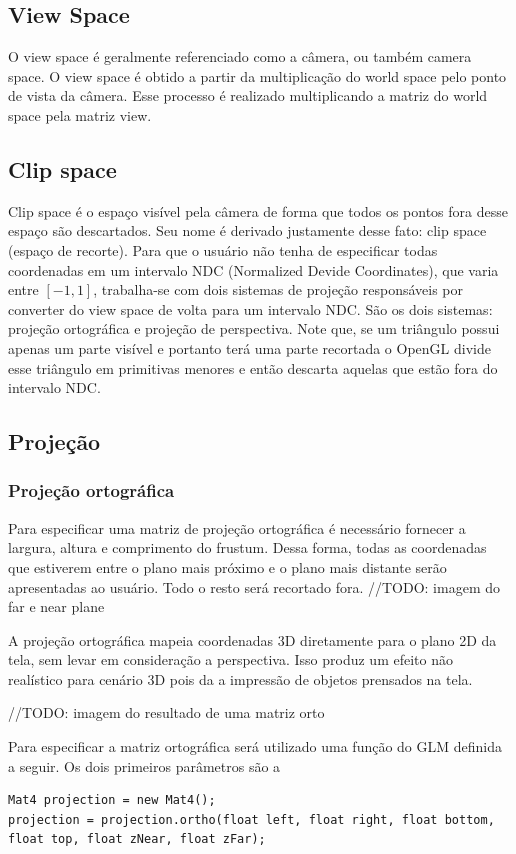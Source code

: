 \documentclass[12pt, 
openright, 
oneside, 
a4paper,    
brazil]{facom-ufu-abntex2}
\begin{document}
\subsection{View Space}
O view space é geralmente referenciado como a câmera, ou também camera space. O view space é obtido a partir da multiplicação do world space pelo ponto de vista da câmera. Esse processo é realizado multiplicando a matriz do world space pela matriz view.

\subsection{Clip space}
Clip space é o espaço visível pela câmera de forma que todos os pontos fora desse espaço são descartados. Seu nome é derivado justamente desse fato: clip space (espaço de recorte). Para que o usuário não tenha de especificar todas coordenadas em um intervalo NDC (Normalized Devide Coordinates), que varia entre $[-1,1]$, trabalha-se com dois sistemas de projeção responsáveis por converter do view space de volta para um intervalo NDC. São os dois sistemas: projeção ortográfica e projeção de perspectiva.
Note que, se um triângulo possui apenas um parte visível e portanto terá uma parte recortada o OpenGL divide esse triângulo em primitivas menores e então descarta aquelas que estão fora do intervalo NDC.

\subsection{Projeção}

\subsubsection{Projeção ortográfica}
Para especificar uma matriz de projeção ortográfica é necessário fornecer a largura, altura e comprimento do frustum. Dessa forma, todas as coordenadas que estiverem entre o plano mais próximo e o plano mais distante serão apresentadas ao usuário. Todo o resto será recortado fora.
//TODO: imagem do far e near plane

A projeção ortográfica mapeia coordenadas 3D diretamente para o plano 2D da tela, sem levar em consideração a perspectiva. Isso produz um efeito não realístico para cenário 3D pois da a impressão de objetos prensados na tela.

//TODO: imagem do resultado de uma matriz orto

Para especificar a matriz ortográfica será utilizado uma função do GLM definida a seguir. Os dois primeiros parâmetros são a 
\begin{lstlisting}[caption=Função Ortho do GLM]
Mat4 projection = new Mat4();
projection = projection.ortho(float left, float right, float bottom, float top, float zNear, float zFar);
\end{lstlisting}
\end{document}
